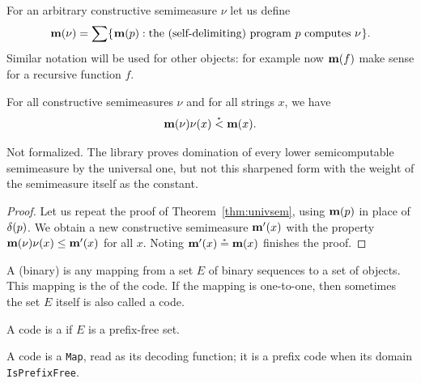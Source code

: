  \begin{definition}
  \label{def:m-of-nu}
  \notready
For an arbitrary constructive semimeasure \( \nu \) let us define
 \begin{equation}\label{eq:m(nu)}
   \mathbf{m}(\nu) = 
\sum\mathopen\{\mskip 1mu\mathbf{m}(p) : \text{the (self-delimiting) program \( p \) computes \( \nu \)}\mskip 1mu\mathclose\}.
 \end{equation}
Similar notation will be used for other objects: for example
now \( \mathbf{m}(f) \) make sense for a recursive function \( f \).
 \end{definition}

 \begin{theorem}
  \notready\label{thm:exact-domin} 
For all constructive semimeasures \( \nu \) and for all strings \( x \), we have 
 \begin{equation}\label{eq:exact-domin}
  \mathbf{m}(\nu) \nu(x) \stackrel{{}_*}{<} \mathbf{m}(x).
 \end{equation}
 \end{theorem}

\begin{formalization}
Not formalized. The library proves domination of every lower semicomputable semimeasure by the universal one, but not this sharpened form with the weight of the semimeasure itself as the constant.
\end{formalization}

 \begin{proof}
  \notready
Let us repeat the proof of Theorem~\ref{thm:univsem}, using \( \mathbf{m}(p) \) in place
of \( \delta(p) \).
We obtain a new constructive semimeasure \( \mathbf{m}'(x) \) with the property
\( \mathbf{m}(\nu)\nu(x) \le \mathbf{m}'(x) \) for all \( x \).
Noting \( \mathbf{m}'(x) \stackrel{{}_*}{=} \mathbf{m}(x) \) finishes the proof.
 \end{proof}

 \begin{definition}
  \label{def:code}
  \leanok
A (binary)  is any
mapping from a set \( E \) of binary sequences to a set of objects. 
This mapping is the  of the code. 
If the mapping is
one-to-one, then sometimes the set \( E \) itself is also called a code.

A code is a  if \( E \) is a prefix-free set.
 \end{definition}
\begin{formalization}
A code is a \texttt{Map}, read as its decoding function; it is a prefix code when its domain \texttt{IsPrefixFree}.
\end{formalization}



